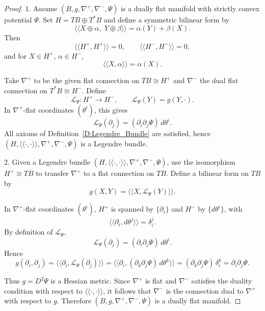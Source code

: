 \documentclass[12pt]{amsart}
\begin{document}
\begin{proof}
1. Assume $(B, g, \nabla^+, \nabla^-, \Psi)$ is a dually flat manifold with strictly convex potential $\Psi$. Set $H = TB \oplus T^*B$
and define a symmetric bilinear form by
\[
\langle\!\langle X \oplus \alpha,\; Y \oplus \beta \rangle\!\rangle
= \alpha(Y) + \beta(X).
\]
Then
\[
\langle\!\langle H^+, H^+ \rangle\!\rangle = 0,
\qquad
\langle\!\langle H^-, H^- \rangle\!\rangle = 0,
\]
and for $X \in H^+$, $\alpha \in H^-$,
\[
\langle\!\langle X, \alpha \rangle\!\rangle = \alpha(X).
\]

Take $\nabla^+$ to be the given flat connection on $TB \cong H^+$ and $\nabla^-$ the dual flat connection on $T^*B \cong H^-$. Define
\[
\mathscr{L}_{\Psi} : H^+ \to H^-,
\qquad
\mathscr{L}_{\Psi}(Y) = g(Y,\cdot).
\]
In $\nabla^+$-flat coordinates $(\theta^i)$, this gives
\[
\mathscr{L}_{\Psi}(\partial_j) = (\partial_i \partial_j \Psi)\, d\theta^i.
\]
All axioms of Definition~\ref{D:Legendre_Bundle} are satisfied, hence $(H,\langle\!\langle \cdot,\cdot \rangle\!\rangle,\nabla^+,\nabla^-,\Psi)$ is a Legendre bundle.

\medskip


2. Given a Legendre bundle $(H,\langle\!\langle \cdot,\cdot \rangle\!\rangle,\nabla^+,\nabla^-,\Psi)$, use the isomorphism $H^+ \cong TB$ to transfer $\nabla^+$ to a flat connection on $TB$. Define a bilinear form on $TB$ by
\[
g(X,Y) = \langle\!\langle X, \mathscr{L}_{\Psi}(Y) \rangle\!\rangle.
\]

In $\nabla^+$-flat coordinates $(\theta^i)$, $H^+$ is spanned by $\{\partial_i\}$ and $H^-$ by $\{d\theta^i\}$, with
\[
\langle\!\langle \partial_i, d\theta^j \rangle\!\rangle = \delta_i^j.
\]
By definition of $\mathscr{L}_{\Psi}$,
\[
\mathscr{L}_{\Psi}(\partial_j) = (\partial_i \partial_j \Psi)\, d\theta^i.
\]
Hence
\[
g(\partial_i, \partial_j)
= \langle\!\langle \partial_i, \mathscr{L}_{\Psi}(\partial_j) \rangle\!\rangle
= \langle\!\langle \partial_i, (\partial_k \partial_j \Psi)\, d\theta^k \rangle\!\rangle
= (\partial_k \partial_j \Psi)\, \delta_i^k
= \partial_i \partial_j \Psi.
\]

Thus $g = D^2 \Psi$ is a Hessian metric. Since $\nabla^+$ is flat and $\nabla^-$ satisfies the duality condition with respect to $\langle\!\langle \cdot,\cdot \rangle\!\rangle$, it follows that $\nabla^-$ is the connection dual to $\nabla^+$ with respect to $g$. Therefore $(B,g,\nabla^+,\nabla^-,\Psi)$ is a dually flat manifold.

\end{proof}
\end{document}
